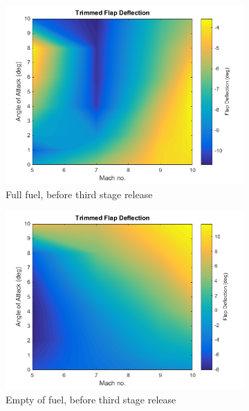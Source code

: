 		\begin{figure}
			\begin{subfigure}{.5\textwidth}
				\centering
				\includegraphics[width=0.99\linewidth]{figures/3_vehicle_design/FlapDeflectionENgineOn}
				\caption{Full fuel, before third stage release}
			\end{subfigure}
			\begin{subfigure}{.5\textwidth}
				\centering
				\includegraphics[width=0.99\linewidth]{figures/3_vehicle_design/FlapDeflectionENgineOn2}
				\caption{Empty of fuel, before third stage release}
				\label{fig:FlapDeflectionENgineOn2}
			\end{subfigure}
			\begin{subfigure}{.5\textwidth}

\end{subfigure}
\end{figure}
